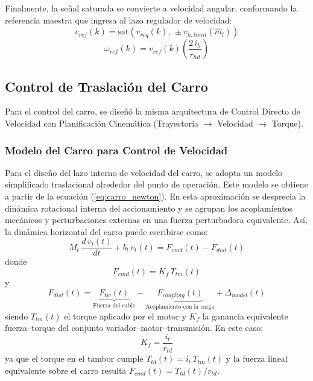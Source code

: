 \documentclass[11pt]{article}                                    %
\begin{document}
Finalmente, la señal saturada se convierte a velocidad angular, conformando la referencia maestra que ingresa al lazo regulador de velocidad:
\begin{equation}
    v_{ref}(k) = \text{sat}\left( v_{req}(k), \, \pm v_{h,limit}(\hat{m}_l) \right)
\end{equation}
\begin{equation}
    \omega_{ref}(k) = v_{ref}(k) \left( \frac{2 \, i_h}{r_{hd}} \right)
\end{equation}

\subsection{Control de Traslación del Carro}
Para el control del carro, se diseñó la misma arquitectura de Control Directo de Velocidad con Planificación Cinemática (Trayectoria $\to$ Velocidad $\to$ Torque).

\subsubsection{Modelo del Carro para Control de Velocidad}
Para el diseño del lazo interno de velocidad del carro, se adopta un modelo simplificado traslacional alrededor del punto de operación. Este modelo se obtiene a partir de la ecuación (\ref{eq:carro_newton}). En esta aproximación se desprecia la dinámica rotacional interna del accionamiento y se agrupan los acoplamientos mecánicos y perturbaciones externas en una fuerza perturbadora equivalente. Así, la dinámica horizontal del carro puede escribirse como:
\begin{equation}
    M_t\,\frac{d \, v_t(t)}{dt} + b_t\,v_t(t) = F_{cmd}(t) - F_{dist}(t)
\end{equation}
donde
\begin{equation}
    F_{cmd}(t)=K_f\,T_{tm}(t)
\end{equation}
y
\begin{equation}
    F_{dist}(t) = \underbrace{F_{tw}(t)}_{\text{Fuerza del cable}}
    - \underbrace{F_{coupling}(t)}_{\text{Acoplamiento con la carga}}
    + \Delta_{model}(t)
\end{equation}
siendo $T_{tm}(t)$ el torque aplicado por el motor y $K_f$ la ganancia equivalente fuerza--torque del conjunto variador--motor--transmisión. En este caso:
\begin{equation}
    K_f = \frac{i_t}{r_{td}}
\end{equation}
ya que el torque en el tambor cumple $T_{td}(t)=i_t\,T_{tm}(t)$ y la fuerza lineal equivalente sobre el carro resulta $F_{cmd}(t)=T_{td}(t)/r_{td}$.
\end{document}

